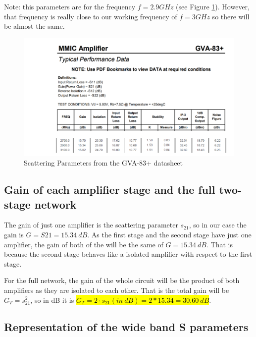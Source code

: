 \documentclass[12pt]{report} %
\newcommand{\highlight}[1]{\sethlcolor{yellow}\hl{#1}}
\begin{document}
Note: this parameters are for the frequency $f = 2.9 GHz$ (see Figure \ref{fig:design_circuit_elements:scattering_parameters_datasheet}). However, that frequency is really close to our working frequency of $f = 3 GHz$ so there will be almost the same.

\begin{figure}[htbp]
    \centering
    \includegraphics[width=\textwidth]{images/design_circuit_elements/scattering_parameters_datasheet.png}
    \caption{Scattering Parameters from the GVA-83+ datasheet}
    \label{fig:design_circuit_elements:scattering_parameters_datasheet}
\end{figure}

\subsection{Gain of each amplifier stage and the full two-stage network}
\label{subsec:gain_each_amplifier_and_full_two_stage}

The gain of just one amplifier is the scattering parameter $s_{21}$, so in our case the gain is $G = S{21} = 15.34 \ dB$. As the first stage and the second stage have just one amplifier, the gain of both of the will be the same of $G = 15.34 \ dB$. That is because the second stage behaves like a isolated amplifier with respect to the first stage.

For the full network, the gain of the whole circuit will be the product of both amplifiers as they are isolated to each other. That is the total gain will be $G_T = s_{21}^2$, so in dB it is \highlight{$G_T = 2 \cdot s_{21} (in \ dB) = 2 * 15.34 = 30.60 \ dB$}.

\subsection{Representation of the wide band S parameters}
\end{document}
